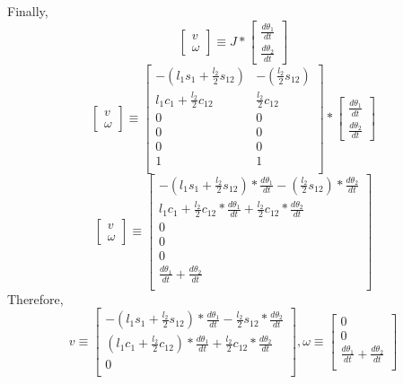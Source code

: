 \documentclass[12pt]{article}
\begin{document}
Finally,
\[
  \begin{bmatrix} v \\ \omega \end{bmatrix}
  \equiv
  J *
  \begin{bmatrix} \frac{d\theta_1}{dt} \\ \frac{d\theta_2}{dt} \end{bmatrix}
\]
\[
  \begin{bmatrix} v \\ \omega \end{bmatrix}
  \equiv
  \begin{bmatrix}
    -(l_1s_1 + \frac{l_2}{2}s_{12}) & -(\frac{l_2}{2}s_{12})\\
    l_1c_1 + \frac{l_2}{2}c_{12} & \frac{l_2}{2}c_{12}\\
    0 & 0 \\
    0 & 0 \\
    0 & 0 \\
    1 & 1 \\
  \end{bmatrix}
  *
  \begin{bmatrix} \frac{d\theta_1}{dt} \\ \frac{d\theta_2}{dt} \end{bmatrix}
\]
\[
  \begin{bmatrix} v \\ \omega \end{bmatrix}
  \equiv
  \begin{bmatrix}
    -(l_1s_1 + \frac{l_2}{2}s_{12}) * \frac{d\theta_1}{dt} - (\frac{l_2}{2}s_{12}) * \frac{d\theta_2}{dt} \\
    l_1c_1 + \frac{l_2}{2}c_{12} * \frac{d\theta_1}{dt} + \frac{l_2}{2}c_{12} * \frac{d\theta_2}{dt}\\
    0 \\
    0 \\
    0 \\
    \frac{d\theta_1}{dt} + \frac{d\theta_2}{dt}\\
  \end{bmatrix}
\]
Therefore,
\[
  v
  \equiv
  \begin{bmatrix}
    -(l_1s_1 + \frac{l_2}{2}s_{12}) * \frac{d\theta_1}{dt} - \frac{l_2}{2}s_{12} * \frac{d\theta_2}{dt} \\
    (l_1c_1 + \frac{l_2}{2}c_{12}) * \frac{d\theta_1}{dt} + \frac{l_2}{2}c_{12} * \frac{d\theta_2}{dt}\\
    0 \\
  \end{bmatrix},
  \omega
  \equiv
  \begin{bmatrix}
    0 \\
    0 \\
    \frac{d\theta_1}{dt} + \frac{d\theta_2}{dt}\\
  \end{bmatrix}
\]
\end{document}
